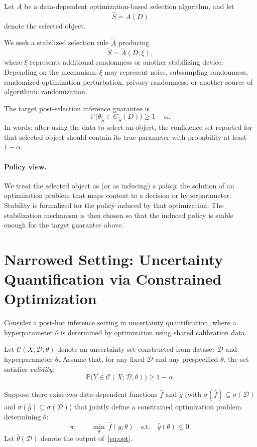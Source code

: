 \documentclass[12pt]{article}
\theoremstyle{plain}
\begin{document}
Let \(A\) be a data-dependent optimization-based selection algorithm, and let
\[
\widehat S = A(D)
\]
denote the selected object.

We seek a stabilized selection rule \(\widetilde A\) producing
\[
\widetilde S = \widetilde A(D;\xi),
\]
where \(\xi\) represents additional randomness or another stabilizing
device.
Depending on the mechanism, \(\xi\) may represent noise, subsampling
randomness, randomized optimization perturbation, privacy randomness,
or another source of algorithmic randomization.

The target post-selection inference guarantee is
\[
\mathbb{P}\bigl(\theta_{\widetilde S}\in C_{\widetilde S}(D)\bigr)
\ge 1-\alpha.
\]
In words: after using the data to select an object, the confidence set
reported for that selected object should contain its true parameter with
probability at least \(1-\alpha\).

\paragraph{Policy view.}
We treat the selected object as (or as inducing) a \emph{policy}:
the solution of an optimization problem that maps context to a decision
or hyperparameter.
Stability is formalized for the policy induced by that optimization.
The stabilization mechanism is then chosen so that the induced policy
is stable enough for the target guarantee above.

\section{Narrowed Setting: Uncertainty Quantification via Constrained Optimization}
Consider a post-hoc inference setting in uncertainty quantification,
where a hyperparameter \(\theta\) is determined by optimization using
shared calibration data.

Let \(\mathcal{C}(X;\mathcal{D},\theta)\) denote an uncertainty set
constructed from dataset \(\mathcal{D}\) and hyperparameter \(\theta\).
Assume that, for any fixed \(\mathcal{D}\) and any prespecified \(\theta\),
the set satisfies \emph{validity}:
\begin{equation}
\label{eq:validity}
\mathbb{P}\bigl(Y\in\mathcal{C}(X;\mathcal{D},\theta)\bigr)
\ge 1-\alpha.
\end{equation}

Suppose there exist two data-dependent functions \(\hat f\) and \(\hat g\)
(with \(\sigma(\hat f)\subseteq\sigma(\mathcal{D})\) and
\(\sigma(\hat g)\subseteq\sigma(\mathcal{D})\)) that jointly define a
constrained optimization problem determining \(\theta\):
\begin{equation}
\label{eq:opt}
\pi:\qquad
\min_{\theta}\ \hat f(y;\theta)
\quad\text{s.t.}\quad
\hat g(\theta)\le 0.
\end{equation}
Let \(\hat\theta(\mathcal{D})\) denote the output of~\eqref{eq:opt}.
\end{document}
